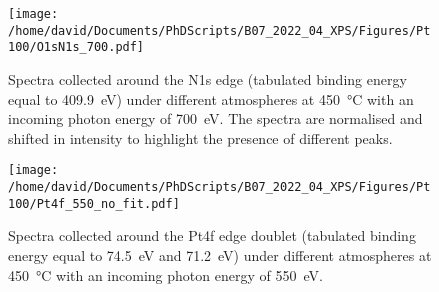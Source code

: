 \begin{table}[!htb]
\centering
{}
\caption{}
\label{tab:XPSPt100}
\end{table}

\begin{figure}[!htb]
    \centering
    \texttt{[image: /home/david/Documents/PhDScripts/B07\_2022\_04\_XPS/Figures/Pt100/O1sN1s\_700.pdf]}
    \caption{
        Spectra collected around the N1s edge (tabulated binding energy equal to \qty{409.9}{\eV}) under different atmospheres at \qty{450}{\degreeCelsius} with an incoming photon energy of \qty{700}{\eV}.
        The spectra are normalised and shifted in intensity to highlight the presence of different peaks.
    }
    \label{fig:O1sN1sPt100}
\end{figure}

\begin{figure}[!htb]
    \centering
    \texttt{[image: /home/david/Documents/PhDScripts/B07\_2022\_04\_XPS/Figures/Pt100/Pt4f\_550\_no\_fit.pdf]}
    \caption{
    	Spectra collected around the Pt4f edge doublet (tabulated binding energy equal to \qty{74.5}{\eV} and \qty{71.2}{\eV}) under different atmospheres at \qty{450}{\degreeCelsius} with an incoming photon energy of \qty{550}{\eV}.
    }
    \label{fig:Pt4fPt100}
\end{figure}


